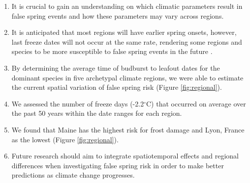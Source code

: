 \documentclass{article}\usepackage[]{graphicx}\usepackage[]{color}
\begin{document}
\begin{enumerate}
\begin{enumerate}
\item It is crucial to gain an understanding on which climatic parameters result in false spring events and how these parameters may vary across regions. 
\item It is anticipated that most regions will have earlier spring onsets, however, last freeze dates will not occur at the same rate, rendering some regions and species to be more susceptible to false spring events in the future \citep{Labe2016}.
\item By determining the average time of budburst to leafout dates for the dominant species in five archetypal climate regions, we were able to estimate the current spatial variation of false spring risk (Figure \ref{fig:regional}).
\item We assessed the number of freeze days (-2.2$^{\circ}$C) \citep{Schwartz1993} that occurred on average over the past 50 years within the date ranges for each region.
\item We found that Maine has the highest risk for frost damage and Lyon, France as the lowest (Figure \ref{fig:regional}). 
\item Future research should aim to integrate spatiotemporal effects and regional differences when investigating false spring risk in order to make better predictions as climate change progresses.
\end {enumerate}
\end{enumerate}

\end{document}
